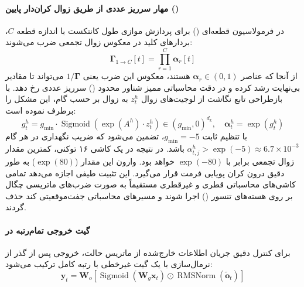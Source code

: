 \paragraph*{مهار سرریز عددی از طریق زوال کران‌دار پایین ()}
در فرمولاسیون قطعه‌ای () برای پردازش موازی طول کانتکست با اندازه قطعه $C$، بردارهای کلید در معکوس زوال تجمعی ضرب می‌شوند:
\begin{equation}
    \boldsymbol{\Gamma}_{1 \to C}[t] = \prod_{r=1}^C \boldsymbol{\alpha}_r[t]
\end{equation}
از آنجا که عناصر $\boldsymbol{\alpha}_r \in (0, 1)$ هستند، معکوس این ضرب یعنی $1/\boldsymbol{\Gamma}$ می‌تواند تا مقادیر بی‌نهایت رشد کرده و در دقت محاسباتی ممیز شناور محدود () سرریز عددی رخ دهد.  با بازطراحی تابع نگاشت از لوجیت‌های زوال $z_t^h$ به زوال بر حسب گام، این مشکل را برطرف نموده است:
\begin{equation}
    g_t^h = g_{\text{min}} \cdot \operatorname{Sigmoid}\left( \exp(A^h) \cdot z_t^h \right) \in (g_{\text{min}}, 0)^{d_k}, \quad \boldsymbol{\alpha}_t^h = \exp(g_t^h)
\end{equation}
با تنظیم ثابت $g_{\text{min}} = -5$، تضمین می‌شود که ضریب نگهداری در هر گام $\alpha_{t,j}^h > \exp(-5) \approx 6.7 \times 10^{-3}$ باشد. در نتیجه در یک کاشی ۱۶ توکنی، کمترین مقدار زوال تجمعی برابر با $\exp(-80)$ خواهد بود. وارون این مقدار ($\exp(80)$) به طور دقیق درون کران پویایی فرمت  قرار می‌گیرد. این تثبیت طیفی اجازه می‌دهد تمامی کاشی‌های محاسباتی قطری و غیرقطری مستقیماً به صورت ضرب‌های ماتریسی چگال بر روی هسته‌های تنسور () اجرا شوند و مسیرهای محاسباتی جفت‌موقعیتی کند حذف گردند.

\paragraph*{گیت خروجی تمام‌رتبه در }
برای کنترل دقیق جریان اطلاعات خارج‌شده از ماتریس حالت، خروجی پس از گذر از نرمال‌سازی با یک گیت غیرخطی با رتبه کامل ترکیب می‌شود:
\begin{equation}
    \mathbf{y}_t = \mathbf{W}_o \left[ \operatorname{Sigmoid}(\mathbf{W}_g \mathbf{x}_t) \odot \operatorname{RMSNorm}(\tilde{\mathbf{o}}_t) \right]
\end{equation}

